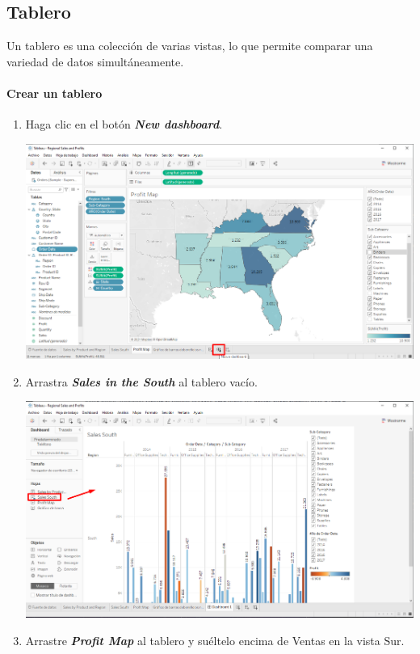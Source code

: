 \documentclass[12pt,letterpaper]{article}
\begin{document}
    \subsection{Tablero}
    Un tablero es una colección de varias vistas, lo que permite comparar una variedad de datos simultáneamente.
    \paragraph{\large Crear un tablero}
    \begin{enumerate}
        \item Haga clic en el botón \textit{\textbf{New dashboard}}.
        \begin{center}
            \includegraphics[width=15cm]{./img/img67.png}
        \end{center}
        \item Arrastra \textit{\textbf{Sales in the South}} al tablero vacío.
        \begin{center}
            \includegraphics[width=15cm]{./img/img68.png}
        \end{center}
        \item Arrastre \textit{\textbf{Profit Map}} al tablero y suéltelo encima de Ventas en la vista Sur.

\end{enumerate}
\end{document}
